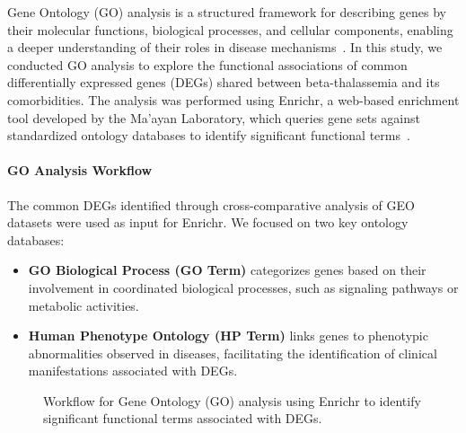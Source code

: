 Gene Ontology (GO) analysis is a structured framework for describing genes by their molecular functions, biological processes, and cellular components, enabling a deeper understanding of their roles in disease mechanisms~\cite{go_ref}. In this study, we conducted GO analysis to explore the functional associations of common differentially expressed genes (DEGs) shared between beta-thalassemia and its comorbidities. The analysis was performed using Enrichr, a web-based enrichment tool developed by the Ma'ayan Laboratory, which queries gene sets against standardized ontology databases to identify significant functional terms~\cite{go_ref}.

\paragraph{GO Analysis Workflow}

The common DEGs identified through cross-comparative analysis of GEO datasets were used as input for Enrichr. We focused on two key ontology databases:
\begin{itemize}
    \item \textbf{GO Biological Process (GO Term)} categorizes genes based on their involvement in coordinated biological processes, such as signaling pathways or metabolic activities.
    \item \textbf{Human Phenotype Ontology (HP Term)} links genes to phenotypic abnormalities observed in diseases, facilitating the identification of clinical manifestations associated with DEGs.
\end{itemize}

\begin{figure}[h]
\centering
{}
\caption{Workflow for Gene Ontology (GO) analysis using Enrichr to identify significant functional terms associated with DEGs.}
\label{fig:go_workflow}
\end{figure}